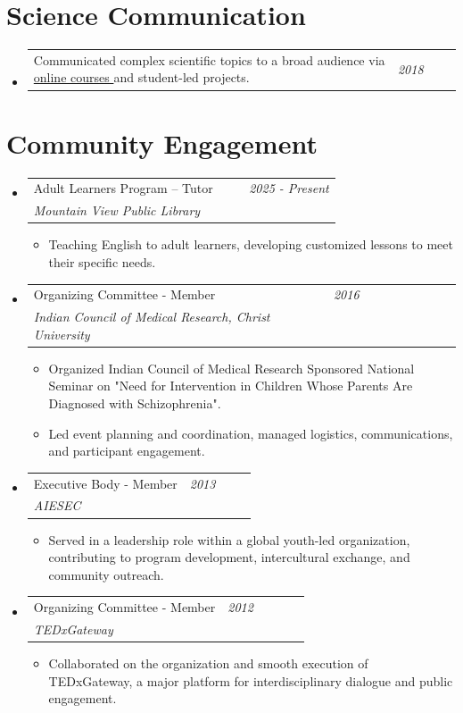 \documentclass[a4paper,11pt]{article}
\newcommand{\resumePOR}[3]{
\vspace{0.5mm}\item
    \begin{tabularx}{0.97\textwidth}[t]{p{0.85\linewidth} >{\raggedleft\arraybackslash}p{0.15\linewidth}}
        \textbf{#1}\hspace{0.3mm}#2 & \textit{\small{#3}} 
    \end{tabularx}
    \vspace{-2mm}
}
\newcommand{\resumeProject}[4]{
\vspace{0.5mm}\item
    \begin{tabularx}{0.98\textwidth}[t]{p{0.7\linewidth} >{\raggedleft\arraybackslash}p{0.3\linewidth}}
        {#1} & \textit{\footnotesize{#3}} \\
        \footnotesize{\textit{#2}} & \footnotesize{#4}
    \end{tabularx}
    \vspace{-2.4mm}
}
\newcommand{\resumeSubHeadingListStart}{\begin{itemize}[leftmargin=*,labelsep=1mm]}
\newcommand{\resumeItemListStart}{\begin{itemize}[leftmargin=*,labelsep=1mm,itemsep=0.5mm]}
\newcommand{\resumeSubHeadingListEnd}{\end{itemize}\vspace{2mm}}
\newcommand{\resumeItemListEnd}{\end{itemize}\vspace{-2mm}}
\begin{document}
\section{\textbf{Science Communication}}
\vspace{-0.4mm}
\resumeSubHeadingListStart
\resumePOR{}
{Communicated complex scientific topics to a broad audience via \href{https://www.futurelearn.com/courses/childhood-adversity-and-mental-health/1}{online courses \faIcon{link}} and student-led projects.}
{2018}
\resumeSubHeadingListEnd
\vspace{-4mm}


\section{\textbf{Community Engagement}}
\vspace{-0.4mm}
\resumeSubHeadingListStart
\resumeProject
{Adult Learners Program – Tutor}
{Mountain View Public Library}
{2025 - Present}
{}
\resumeItemListStart
\item Teaching English to adult learners, developing customized lessons to meet their specific needs.
\resumeItemListEnd

\resumeProject
{Organizing Committee - Member}
{Indian Council of Medical Research, Christ University}
{2016}
{}
\resumeItemListStart
\item Organized Indian Council of Medical Research Sponsored National
Seminar on "Need for Intervention in Children Whose Parents Are Diagnosed
with Schizophrenia".
\item Led event planning and coordination, managed logistics,
communications, and participant engagement.
\resumeItemListEnd

\resumeProject
{Executive Body - Member}
{AIESEC}
{2013}
{}
\resumeItemListStart
\item Served in a leadership role within a global youth-led organization, contributing to program development, intercultural exchange, and community outreach.
\resumeItemListEnd

\resumeProject
{Organizing Committee - Member}
{TEDxGateway}
{2012}
{}
\resumeItemListStart
\item Collaborated on the organization and smooth execution of TEDxGateway, a major platform for interdisciplinary dialogue and public engagement.
\resumeItemListEnd
\resumeSubHeadingListEnd
\vspace{-6mm}
\end{document}
